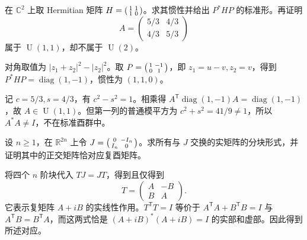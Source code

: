 \begin{exercise}\label{b2:ex:10-indefinite-hermitian}
	在 \(\mathbb C^2\) 上取 Hermitian 矩阵 \(H=\begin{psmallmatrix}1&1\\1&0\end{psmallmatrix}\)。求其惯性并给出 \(P^*HP\) 的标准形。再证明
	\[
		A=\begin{pmatrix}5/3&4/3\\4/3&5/3\end{pmatrix}
	\]
	属于 \(\operatorname U(1,1)\)，却不属于 \(\operatorname U(2)\)。
\end{exercise}
\begin{solution}
	对角取值为 \(|z_1+z_2|^2-|z_2|^2\)。取 \(P=\begin{psmallmatrix}1&-1\\0&1\end{psmallmatrix}\)，即 \(z_1=u-v,z_2=v\)，得到 \(P^*HP=\operatorname{diag}(1,-1)\)，惯性为 \((1,1,0)\)。

	记 \(c=5/3,s=4/3\)，有 \(c^2-s^2=1\)。相乘得 \(A^{\mathsf T}\operatorname{diag}(1,-1)A=\operatorname{diag}(1,-1)\)，故 \(A\in\operatorname U(1,1)\)。但第一列的普通模平方为 \(c^2+s^2=41/9\ne1\)，所以 \(A^*A\ne I\)，不在标准酉群中。
\end{solution}

\begin{exercise}\label{b2:ex:10-unitary-real-blocks}
	设 \(n\ge1\)，在 \(\mathbb R^{2n}\) 上令 \(J=\begin{psmallmatrix}0&-I_n\\I_n&0\end{psmallmatrix}\)。求所有与 \(J\) 交换的实矩阵的分块形式，并证明其中的正交矩阵恰对应复酉矩阵。
\end{exercise}
\begin{solution}
	将四个 \(n\) 阶块代入 \(TJ=JT\)，得到且仅得到
	\[
		T=\begin{pmatrix}A&-B\\B&A\end{pmatrix}.
	\]
	它表示复矩阵 \(A+iB\) 的实线性作用。\(T^{\mathsf T}T=I\) 等价于 \(A^{\mathsf T}A+B^{\mathsf T}B=I\) 与 \(A^{\mathsf T}B=B^{\mathsf T}A\)，而这两式恰是 \((A+iB)^*(A+iB)=I\) 的实部和虚部。因此得到所述对应。
\end{solution}

